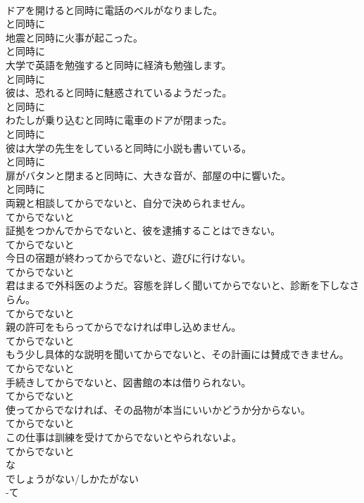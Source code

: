\documentclass[8pt]{extreport}
\begin{document}
\begin{CJK}{UTF8}{min}
\\	ドアを開けると同時に電話のベルがなりました。	
\\	と同時に
\\	地震と同時に火事が起こった。	
\\	と同時に
\\	大学で英語を勉強すると同時に経済も勉強します。	
\\	と同時に
\\	彼は、恐れると同時に魅惑されているようだった。	
\\	と同時に
\\	わたしが乗り込むと同時に電車のドアが閉まった。	
\\	と同時に
\\	彼は大学の先生をしていると同時に小説も書いている。	
\\	と同時に
\\	扉がバタンと閉まると同時に、大きな音が、部屋の中に響いた。	
\\	と同時に
\\	両親と相談してからでないと、自分で決められません。	
\\	てからでないと
\\	証拠をつかんでからでないと、彼を逮捕することはできない。	
\\	てからでないと
\\	今日の宿題が終わってからでないと、遊びに行けない。	
\\	てからでないと
\\	君はまるで外科医のようだ。容態を詳しく聞いてからでないと、診断を下しなさらん。	
\\	てからでないと
\\	親の許可をもらってからでなければ申し込めません。	
\\	てからでないと
\\	もう少し具体的な説明を聞いてからでないと、その計画には賛成できません。	
\\	てからでないと
\\	手続きしてからでないと、図書館の本は借りられない。	
\\	てからでないと
\\	使ってからでなければ、その品物が本当にいいかどうか分からない。	
\\	てからでないと
\\	この仕事は訓練を受けてからでないとやられないよ。	
\\	てからでないと
\\	な
\\	でしょうがない/しかたがない	
\\	-て

\end{CJK}
\end{document}
